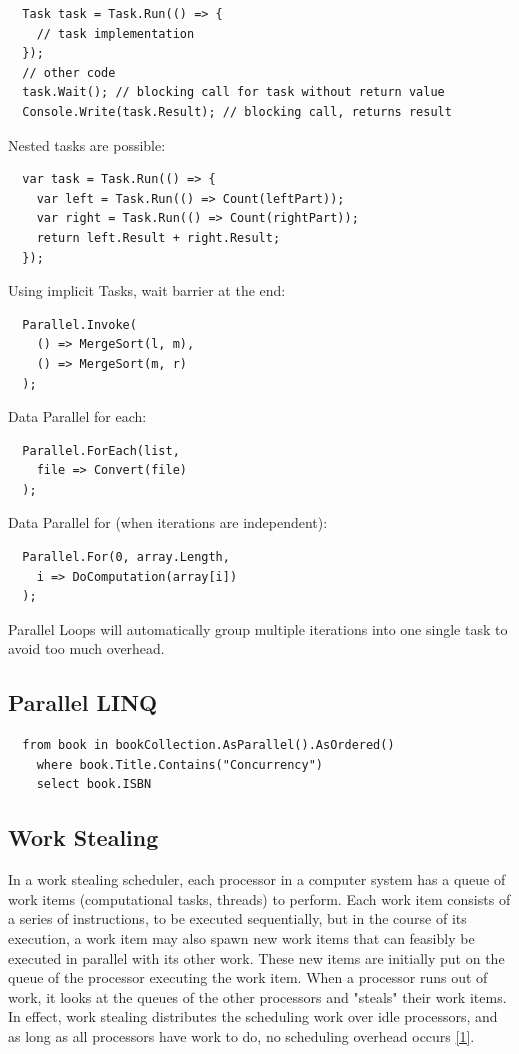 \begin{lstlisting}
  Task task = Task.Run(() => {
    // task implementation
  });
  // other code
  task.Wait(); // blocking call for task without return value
  Console.Write(task.Result); // blocking call, returns result
\end{lstlisting}

Nested tasks are possible:

\begin{lstlisting}
  var task = Task.Run(() => {
    var left = Task.Run(() => Count(leftPart));
    var right = Task.Run(() => Count(rightPart));
    return left.Result + right.Result;
  });
\end{lstlisting}

Using implicit Tasks, wait barrier at the end: \begin{lstlisting}
  Parallel.Invoke(
    () => MergeSort(l, m),
    () => MergeSort(m, r)
  );
\end{lstlisting}

Data Parallel for each:
\begin{lstlisting}
  Parallel.ForEach(list, 
    file => Convert(file)
  );
\end{lstlisting}


Data Parallel for (when iterations are independent):
\begin{lstlisting}
  Parallel.For(0, array.Length, 
    i => DoComputation(array[i])
  );
\end{lstlisting}

Parallel Loops will automatically group multiple iterations into one single task to avoid too much overhead.

\subsection{Parallel LINQ}

\begin{lstlisting}
  from book in bookCollection.AsParallel().AsOrdered()
    where book.Title.Contains("Concurrency")
    select book.ISBN
\end{lstlisting}

\subsection{Work Stealing}
In a work stealing scheduler, each processor in a computer system has a queue of work items (computational tasks, threads) to perform. 
Each work item consists of a series of instructions, to be executed sequentially, but in the course of its execution, a work item may also spawn new work items that can feasibly be executed in parallel with its other work. 
These new items are initially put on the queue of the processor executing the work item. 
When a processor runs out of work, it looks at the queues of the other processors and "steals" their work items. 
In effect, work stealing distributes the scheduling work over idle processors, and as long as all processors have work to do, no scheduling overhead occurs \href{https://en.wikipedia.org/wiki/Work\_stealing}{[1]}.